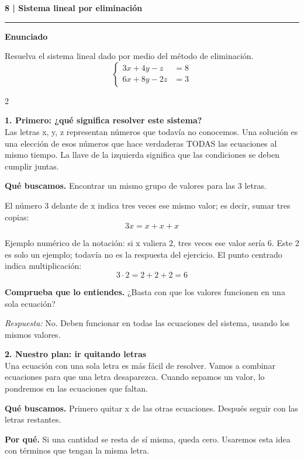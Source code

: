 \documentclass[11pt,a4paper,landscape]{article}
\newcommand{\titulo}[1]{{\LARGE\bfseries #1}\par\smallskip\hrule\medskip}
\begin{document}
\newpage{}\hypertarget{1.1-8}{}
\titulo{8 | Sistema lineal por eliminación}
\textbf{Enunciado}\par Resuelva el sistema lineal dado por medio del método de eliminación.
\[\left\{\begin{aligned}3x + 4y - z &= 8\\6x + 8y - 2z &= 3\end{aligned}\right.\]
\begin{multicols*}{2}
\noindent\begin{minipage}{\linewidth}\textbf{1. Primero: ¿qué significa resolver este sistema?}\\[2pt]Las letras x, y, z representan números que todavía no conocemos. Una solución es una elección de esos números que hace verdaderas TODAS las ecuaciones al mismo tiempo. La llave de la izquierda significa que las condiciones se deben cumplir juntas.
\par\smallskip\textbf{Qué buscamos.} Encontrar un mismo grupo de valores para las 3 letras.
\par\smallskip El número 3 delante de x indica tres veces ese mismo valor; es decir, sumar tres copias:
\[3x=x+x+x\]
\par\smallskip Ejemplo numérico de la notación: si x valiera 2, tres veces ese valor sería 6. Este 2 es solo un ejemplo; todavía no es la respuesta del ejercicio. El punto centrado indica multiplicación:
\[3\cdot 2=2+2+2=6\]
\par\smallskip\textbf{Comprueba que lo entiendes.} ¿Basta con que los valores funcionen en una sola ecuación?\par\textit{Respuesta:} No. Deben funcionar en todas las ecuaciones del sistema, usando los mismos valores.
\end{minipage}\par\medskip
\noindent\begin{minipage}{\linewidth}\textbf{2. Nuestro plan: ir quitando letras}\\[2pt]Una ecuación con una sola letra es más fácil de resolver. Vamos a combinar ecuaciones para que una letra desaparezca. Cuando sepamos un valor, lo pondremos en las ecuaciones que faltan.
\par\smallskip\textbf{Qué buscamos.} Primero quitar x de las otras ecuaciones. Después seguir con las letras restantes.
\par\smallskip\textbf{Por qué.} Si una cantidad se resta de sí misma, queda cero. Usaremos esta idea con términos que tengan la misma letra.

\end{minipage}
\end{multicols*}
\end{document}
